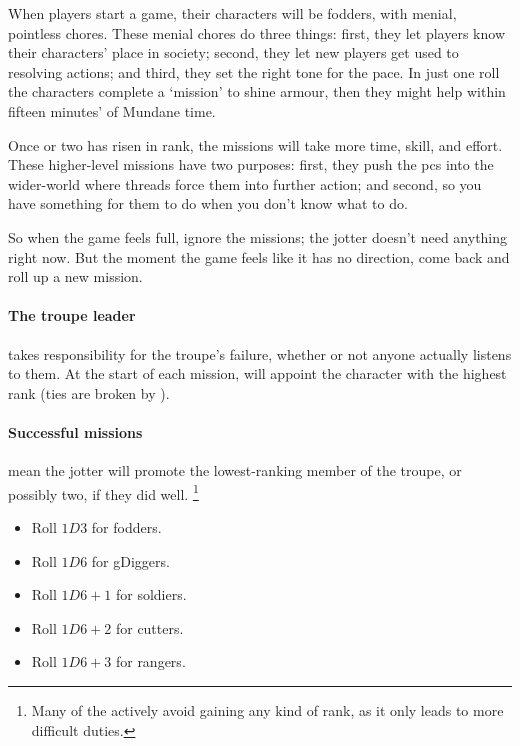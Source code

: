 \begin{multicols}{2}

\noindent
When players start a game, their characters will be \glspl{fodder}, with menial, pointless chores.
These menial chores do three things: first, they let players know their characters' place in society; second, they let new players get used to resolving actions; and third, they set the right tone for the pace.
In just one roll the characters complete a `mission' to shine armour, then they might help  within fifteen minutes' of Mundane time.

Once  or two has risen in rank, the missions will take more time, skill, and effort.
These higher-level missions have two purposes: first, they push the \glspl{pc} into the wider-world where \glspl{thread} force them into further action; and second, so you have something for them to do when you don't know what to do.

So when the game feels full, ignore the missions; the \gls{jotter} doesn't need anything right now.
But the moment the game feels like it has no direction, come back and roll up a new mission.

\paragraph{The troupe leader}
takes responsibility for the troupe's failure, whether or not anyone actually listens to them.
At the start of each mission,  will appoint the character with the highest rank (ties are broken by ).

\paragraph{Successful missions}
mean the \gls{jotter} will promote the lowest-ranking member of the troupe, or possibly two, if they did well.%
\footnote{Many of the  actively avoid gaining any kind of rank, as it only leads to more difficult duties.}

\null
\begin{itemize}
  \item
  Roll $1D3$ for \glspl{fodder}.
  \item
  Roll $1D6$ for \glspl{gDigger}.
  \item
  Roll $1D6+1$ for \glspl{soldier}.
  \item
  Roll $1D6+2$ for \glspl{cutter}.
  \item
  Roll $1D6+3$ for \glspl{ranger}.
\end{itemize}


\end{multicols}
